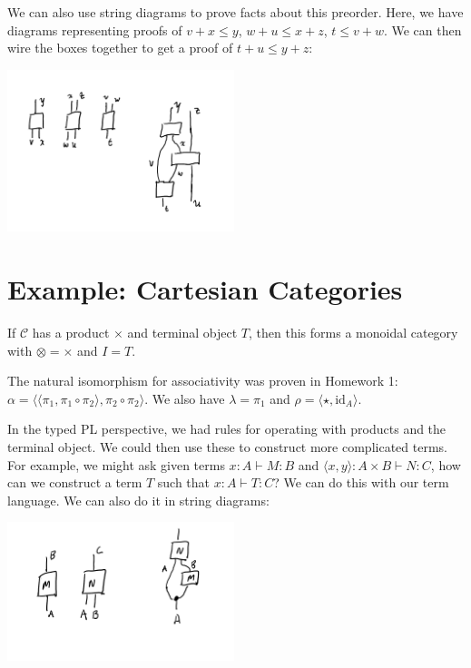 We can also use string diagrams to prove facts about this
preorder. Here, we have diagrams representing proofs of \(v+x \le y\),
\(w + u \le x + z\), \(t \le v + w\). We can then wire the boxes
together to get a proof of \(t + u \le y + z\): 

\begin{center}
  \includegraphics[width=250px]{fig/monoidal-categories-reals.png}
\end{center}


\section{Example: Cartesian Categories}

If \(\mathcal{C}\) has a product \(\times\) and terminal object \(T\),
then this forms a monoidal category with \(\otimes = \times\) and
\(I = T\).

The natural isomorphism for associativity was proven in Homework 1:
\(\alpha = \langle \langle \pi_1, \pi_1 \circ \pi_2 \rangle, 
\pi_2 \circ \pi_2 \rangle\).
We also have \(\lambda = \pi_1\) and
\(\rho = \langle \star, \text{id}_A \rangle\).

In the typed PL perspective, we had rules for operating with products
and the terminal object. We could then use these to construct more
complicated terms. For example, we might ask given terms \(x : A \vdash M : B\) 
and \(\langle x, y \rangle : A \times B \vdash N : C\), how can we construct
a term \(T\) such that \(x : A \vdash T : C\)? We can do this with our
term language. We can also do it in string diagrams: 

\begin{center}
  \includegraphics[width=250px]{fig/monoidal-categories-ccc.png}
\end{center}


